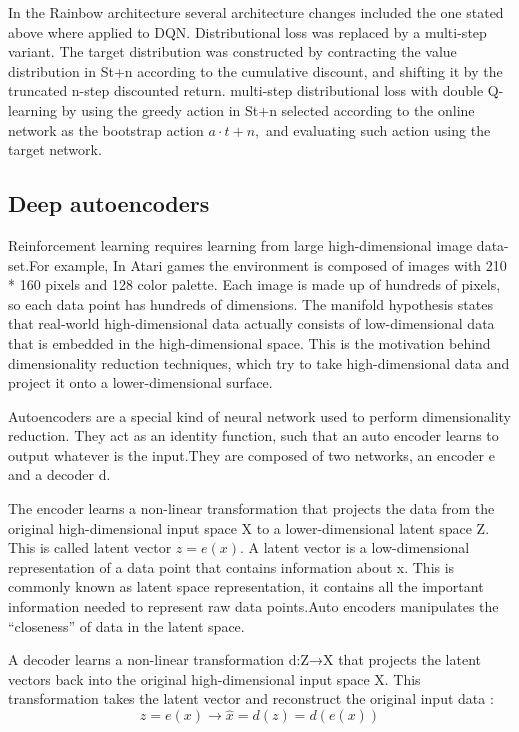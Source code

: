 In the Rainbow architecture \cite{rainbow} 
several architecture changes included the one stated above where applied to DQN.
Distributional loss was replaced by a multi-step variant. The target
distribution was constructed  by contracting the value distribution
in St+n according to the cumulative discount, 
and shifting it by the truncated n-step discounted return. 
multi-step distributional loss with double Q-learning by using the greedy action in St+n 
selected according to the online network as the bootstrap action $a \cdot t+n,$ and evaluating such action using the target network.




\subsection{Deep autoencoders}


Reinforcement learning requires learning from large  high-dimensional image
data-set.For example, In Atari games the environment is composed of images with
210 * 160 pixels and 128 color palette. Each image is made up of hundreds of
pixels, so each data point has hundreds of dimensions. The manifold hypothesis
states that real-world high-dimensional data actually consists of
low-dimensional data that is embedded in the high-dimensional space. This is
the motivation behind dimensionality reduction techniques, which try to take
high-dimensional data and project it onto a lower-dimensional surface.

Autoencoders are a special kind of neural network used to perform
dimensionality reduction. They act as an identity function, such that an auto
encoder learns to output whatever is the input.They are  composed of two
networks, an encoder e and a decoder d.  

The encoder learns a non-linear
transformation that projects the data from the original high-dimensional input
space X to a lower-dimensional latent space Z. 
This is called latent  vector $z=e(x) $. 
A latent vector is a low-dimensional representation of a data point
that contains information about x.
This is commonly known  as latent space representation,
it contains all the important information needed to represent
raw data points.Auto encoders manipulates the ``closeness'' of data in the latent
space.  

A decoder learns a non-linear transformation d:Z→X that projects the
latent vectors back into the original high-dimensional input space X. This
transformation takes the latent vector and reconstruct the original input data
: 
\begin{equation}
     z = e(x)  	\rightarrow  \hat{x}=d(z)=d(e(x))
\end{equation}

